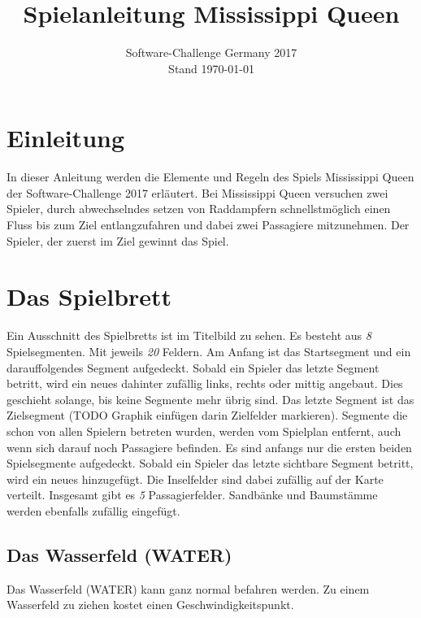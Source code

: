 \documentclass[12pt,a4paper, ngerman, oneside]{scrartcl}
\date{Software-Challenge Germany 2017\\Stand \today}
\title{Spielanleitung Mississippi Queen}
\newcommand\blfootnote[1]{%
  \begingroup
  \renewcommand\thefootnote{}\footnote{#1}%
  \addtocounter{footnote}{-1}%
  \endgroup
}
\newcommand{\Tiles}{\emph{8}}
\newcommand{\FieldsPerTile}{\emph{20}}
\newcommand{\Passagiere}{\emph{5}}
\begin{document}
\maketitle
\vspace*{\fill}


\newpage
\tableofcontents
\thispagestyle{empty}
\newpage
\setcounter{page}{1}
\section{Einleitung}
In dieser Anleitung werden die Elemente und Regeln des Spiels Mississippi Queen der
Software-Challenge 2017 erläutert.
Bei Mississippi Queen versuchen zwei Spieler, durch abwechselndes setzen von Raddampfern 
schnellstmöglich einen Fluss bis zum Ziel entlangzufahren und dabei zwei Passagiere mitzunehmen.
Der Spieler, der zuerst im Ziel gewinnt das Spiel.
\section{Das Spielbrett}
Ein Ausschnitt des Spielbretts ist im Titelbild zu sehen. Es besteht aus \emph{\Tiles} Spielsegmenten. Mit jeweils \emph{\FieldsPerTile} Feldern. Am Anfang ist das Startsegment und ein darauffolgendes Segment aufgedeckt. Sobald ein Spieler das letzte Segment betritt, wird ein neues dahinter zufällig links, rechts oder mittig angebaut. Dies geschieht solange, bis keine Segmente mehr übrig sind. Das letzte Segment ist das Zielsegment (TODO Graphik einfügen darin Zielfelder markieren). Segmente die schon von allen Spielern betreten wurden, werden vom Spielplan entfernt, auch wenn sich darauf noch Passagiere befinden. Es sind anfangs nur die ersten beiden Spielsegmente aufgedeckt. Sobald ein Spieler das letzte sichtbare Segment betritt, wird ein neues hinzugefügt.
Die Inselfelder sind dabei zufällig auf der Karte verteilt. Insgesamt gibt es \emph{\Passagiere} Passagierfelder. Sandbänke und Baumstämme werden ebenfalls zufällig eingefügt.
\subsection{Das Wasserfeld (WATER)}
Das Wasserfeld (WATER) kann ganz normal befahren werden. Zu einem Wasserfeld zu ziehen kostet einen Geschwindigkeitspunkt.
\end{document}
